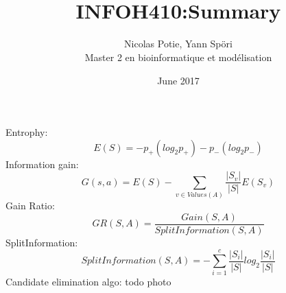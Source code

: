 \documentclass{article}
\author{Nicolas Potie, Yann Sp\"ori\\ Master 2 en bioinformatique et modélisation}
\title{\\INFOH410:Summary}
\date{June 2017}
\makeatletter
\def\maketitle{%
  \null
  \thispagestyle{empty}%
  \vfill
  \begin{center}\leavevmode
    \normalfont
    \texttt{[image: ./ulb.jpg]}
    {\LARGE \@title\par}%
    \vskip 0.5cm
    {\Large \@author\par}%
    \vskip 0.5cm
    {\Large \@date\par}%
  \end{center}%
  \vfill
  \null
  \newpage
  }
\makeatother
\begin{document}
\pagebreak

Entrophy:\\
\[
E(S)=-p_{+}(log_2{p_{+}})-p_{-}(log_2{p_{-}})
\]
Information gain:\\
\[
G(s,a) = E(S)-\sum_{v \in Values(A)} \frac{|S_v|}{|S|}E(S_v)
\]
Gain Ratio:
\[
GR(S,A) = \frac{Gain(S,A)}{SplitInformation(S,A)}
\]
SplitInformation:
\[
SplitInformation(S,A) = - \sum_{i=1}^{c} \frac{|S_i|}{|S|} log_2 \frac{|S_i|}{|S|}
\]
Candidate elimination algo:
todo photo
\end{document}
